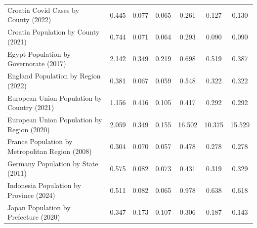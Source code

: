 \begin{tabular}{lccc|ccc}
                     Croatia Covid Cases by County (2022) &         0.445 &         0.077 &            0.065 &                                    0.261 &                                    0.127 &                                       0.130 \\
                      Croatia Population by County (2021) &         0.744 &         0.071 &            0.064 &                                    0.293 &                                    0.090 &                                       0.090 \\
                   Egypt Population by Governorate (2017) &         2.142 &         0.349 &            0.219 &                                    0.698 &                                    0.519 &                                       0.387 \\
                      England Population by Region (2022) &         0.381 &         0.067 &            0.059 &                                    0.548 &                                    0.322 &                                       0.322 \\
              European Union Population by Country (2021) &         1.156 &         0.416 &            0.105 &                                    0.417 &                                    0.292 &                                       0.292 \\
               European Union Population by Region (2020) &         2.059 &         0.349 &            0.155 &                                   16.502 &                                   10.375 &                                      15.529 \\
          France Population by Metropolitan Region (2008) &         0.304 &         0.070 &            0.057 &                                    0.478 &                                    0.278 &                                       0.278 \\
                       Germany Population by State (2011) &         0.575 &         0.082 &            0.073 &                                    0.431 &                                    0.319 &                                       0.329 \\
                  Indonesia Population by Province (2024) &         0.511 &         0.082 &            0.065 &                                    0.978 &                                    0.638 &                                       0.618 \\
                    Japan Population by Prefecture (2020) &         0.347 &         0.173 &            0.107 &                                    0.306 &                                    0.187 &                                       0.143 \\

\end{tabular}

